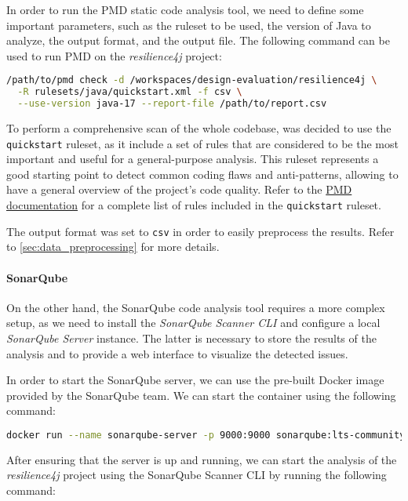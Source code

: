 In order to run the PMD static code analysis tool, we need to define some important parameters, such as the ruleset to be used, the version of Java to analyze, the output format, and the output file. The following command can be used to run PMD on the \textit{resilience4j} project:

\begin{lstlisting}[language=bash, caption={Command to run PDM static code analysis}]
/path/to/pmd check -d /workspaces/design-evaluation/resilience4j \
  -R rulesets/java/quickstart.xml -f csv \
  --use-version java-17 --report-file /path/to/report.csv
\end{lstlisting}

\noindent To perform a comprehensive scan of the whole codebase, was decided to use the \texttt{quickstart} ruleset, as it include a set of rules that are considered to be the most important and useful for a general-purpose analysis. This ruleset represents a good starting point to detect common coding flaws and anti-patterns, allowing to have a general overview of the project's code quality. Refer to the \href{https://pmd.github.io/pmd/pmd_rules_java.html#additional-rulesets}{PMD documentation} for a complete list of rules included in the \texttt{quickstart} ruleset.

The output format was set to \texttt{csv} in order to easily preprocess the results. Refer to \autoref{sec:data_preprocessing} for more details.

\paragraph{SonarQube}

On the other hand, the SonarQube code analysis tool requires a more complex setup, as we need to install the \textit{SonarQube Scanner CLI} and configure a local \textit{SonarQube Server} instance. The latter is necessary to store the results of the analysis and to provide a web interface to visualize the detected issues.

In order to start the SonarQube server, we can use the pre-built Docker image provided by the SonarQube team. We can start the container using the following command:

\begin{lstlisting}[language=bash, caption={Starting the SonarQube server}]
docker run --name sonarqube-server -p 9000:9000 sonarqube:lts-community
\end{lstlisting}

\noindent After ensuring that the server is up and running, we can start the analysis of the \textit{resilience4j} project using the SonarQube Scanner CLI by running the following command:

